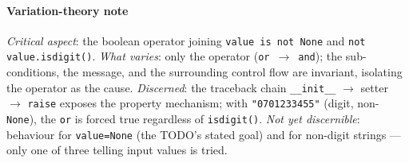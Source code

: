 \documentclass{article}
\begin{document}
\paragraph*{Variation-theory note}
\textit{Critical aspect}: the boolean operator joining
\verb|value is not None| and \verb|not value.isdigit()|.
\textit{What varies}: only the operator (\verb|or|~$\to$~\verb|and|);
the sub-conditions, the message, and the surrounding control flow are
invariant, isolating the operator as the cause.
\textit{Discerned}: the traceback chain
\verb|__init__| $\to$ setter $\to$ \verb|raise| exposes the property
mechanism; with \verb|"0701233455"| (digit, non-\verb|None|), the
\verb|or| is forced true regardless of \verb|isdigit()|.
\textit{Not yet discernible}: behaviour for \verb|value=None| (the
TODO's stated goal) and for non-digit strings --- only one of three
telling input values is tried.

\vspace{1em}
\end{document}
